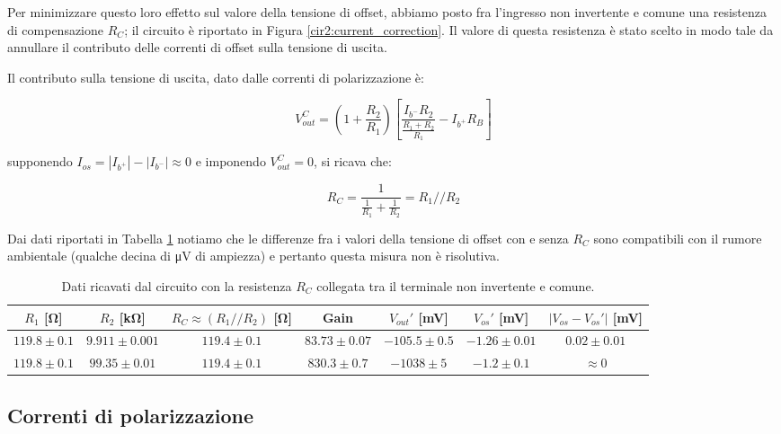 Per minimizzare questo loro effetto sul valore della tensione di offset, abbiamo posto fra l'ingresso non invertente e comune una resistenza di compensazione $R_C$; il circuito è riportato in Figura \ref{cir2:current_correction}. Il valore di questa resistenza è stato scelto in modo tale da annullare il contributo delle correnti di offset sulla tensione di uscita.

Il contributo sulla tensione di uscita, dato dalle correnti di polarizzazione è:

\begin{equation}
V_{out}^{C} = \left( 1+\frac{R_2}{R_1} \right)\left[ \frac{I_{b^-}R_2}{\frac{R_1+R_2}{R_1}} - I_{b^+} R_B\right]
\label{eq2:Vout_currents}
\end{equation}

supponendo $I_{os} = |I_{b^+}|-|I_{b^-}| \approx 0$ e imponendo $V_{out}^{C}=0$, si ricava che:

$$R_C=\frac{1}{\frac{1}{R_1} + \frac{1}{R_2}} = R_1 // R_2$$

Dai dati riportati in Tabella \ref{tab2:RC} notiamo che le differenze fra i valori della tensione di offset con e senza $R_C$ sono compatibili con il rumore ambientale (qualche decina di \si{\micro\volt} di ampiezza) e pertanto questa misura non è risolutiva.

\begin{table}[H]
\begin{center}
{\renewcommand{\arraystretch}{1.2}%
\begin{tabular}{c|c|c|c|c|c|c}
$R_1$ [\si{\ohm}] & $R_2$ [\si{\kilo\ohm}] & $R_C \approx (R_1 // R_2)$ [\si{\ohm}] & Gain & $V_{out}'$  [\si{\milli\volt}] & $V_{os}'$ [\si{\milli\volt}] & $|V_{os}-V_{os}'|$ [\si{\milli\volt}] \\ 
\hline 
$119.8\pm0.1$ & $9.911\pm0.001$ & $119.4\pm0.1$ & $83.73 \pm 0.07$ & $-105.5 \pm 0.5$ & $-1.26 \pm0.01$ & $0.02\pm0.01$ \\
\hline
$119.8\pm0.1$ & $99.35\pm0.01$ & $119.4\pm0.1$ & $830.3\pm0.7$ &$ -1038 \pm 5$ & $-1.2 \pm 0.1$ & $\approx 0$\\
\end{tabular}}
\end{center}
\caption{Dati ricavati dal circuito con la resistenza $R_C$ collegata tra il terminale non invertente e comune.}
\label{tab2:RC}
\end{table}

\newpage
\subsection{Correnti di polarizzazione}

